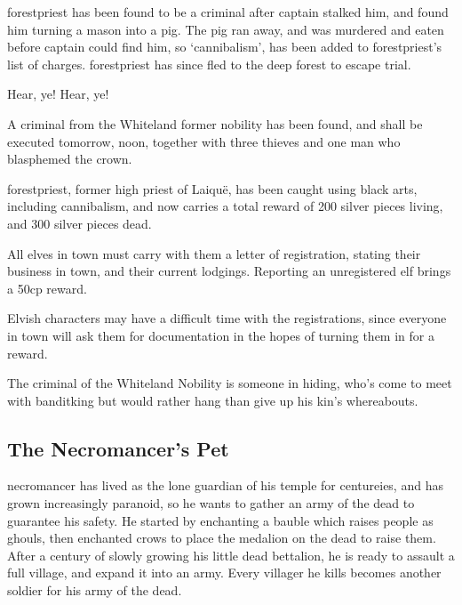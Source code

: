 \begin{multicols}{2}

\Gls{forestpriest} has been found to be a criminal after \gls{captain} stalked him, and found him turning a mason into a pig.
The pig ran away, and was murdered and eaten before \gls{captain} could find him, so `cannibalism', has been added to \gls{forestpriest}'s list of charges.
\Gls{forestpriest} has since fled to the deep forest to escape trial.

\begin{speechtext}

	Hear, ye! Hear, ye!

	A criminal from the Whiteland former nobility has been found, and shall be executed tomorrow, noon, together with three thieves and one man who blasphemed the crown.

	\Gls{forestpriest}, former high priest of Laiqu\"{e}, has been caught using black arts, including cannibalism, and now carries a total reward of 200 silver pieces living, and 300 silver pieces dead.

	All elves in town must carry with them a letter of registration, stating their business in town, and their current lodgings.  Reporting an unregistered elf brings a 50cp reward.

\end{speechtext}

Elvish characters may have a difficult time with the registrations, since everyone in town will ask them for documentation in the hopes of turning them in for a reward.

The criminal of the Whiteland Nobility is someone in hiding, who's come to meet with \gls{banditking} but would rather hang than give up his kin's whereabouts.

\subsection[The Necromancer's Pet]{The Necromancer's Pet}\label{necromancerspet}

\Gls{necromancer} has lived as the lone guardian of his temple for centureies, and has grown increasingly paranoid, so he wants to gather an army of the dead to guarantee his safety.
He started by enchanting a bauble which raises people as ghouls, then enchanted crows to place the medalion on the dead to raise them.
After a century of slowly growing his little dead bettalion, he is ready to assault a full village, and expand it into an army.
Every villager he kills becomes another soldier for his army of the dead.


\end{multicols}
